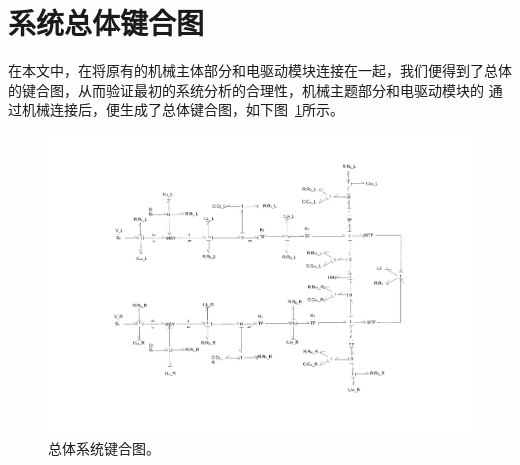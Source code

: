 \clearpage
\section{系统总体键合图}

在本文中，在将原有的机械主体部分和电驱动模块连接在一起，我们便得到了总体的键合图，从而验证最初的系统分析的合理性，机械主题部分和电驱动模块的
通过机械连接后，便生成了总体键合图，如下图~\ref{fig:overall}所示。

\begin{figure}[!h]
	\centering
	\includegraphics[width=1.25\textwidth,angle=90]{fig/overall.pdf}
	\caption{总体系统键合图。}\label{fig:overall}
\end{figure}
